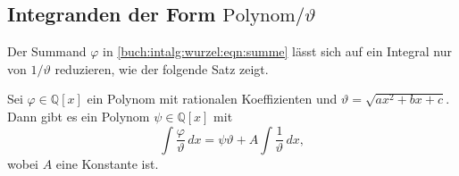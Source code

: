 %
%
\subsection{Integranden der Form $\text{Polynom}/\vartheta$}
Der Summand $\varphi$ in
\eqref{buch:intalg:wurzel:eqn:summe}
lässt sich auf ein Integral nur von $1/\vartheta$ reduzieren,
wie der folgende Satz zeigt.

\begin{satz}
\label{buch:intalg:wurzel:satz:polynomtheta}
Sei $\varphi\in\mathbb{Q}[x]$ ein Polynom mit rationalen Koeffizienten
und $\vartheta=\!\sqrt{ax^2+bx+c}$.
Dann gibt es ein Polynom $\psi\in\mathbb{Q}[x]$ mit 
\begin{equation}
\int\frac{\varphi}{\vartheta}\,dx
=
\psi\vartheta
+
A\int\frac{1}{\vartheta}\,dx,
\label{buch:intalg:wurzel:eqn:polytheta}
\end{equation}
wobei $A$ eine Konstante ist.
\end{satz}


